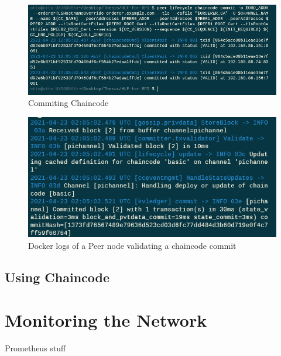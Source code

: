\begin{figure}
    \centering
    \includegraphics{images/chaincodecommit.PNG}
    \caption{Commiting Chaincode}
    \label{fig:my_label}
\end{figure}

\begin{figure}
    \centering
    \includegraphics{images/peervalidatingcommit.PNG}
    \caption{Docker logs of a Peer node validating a chaincode commit}
    \label{fig:my_label}
\end{figure}

\subsection{Using Chaincode}


\section{Monitoring the Network}

Prometheus stuff

